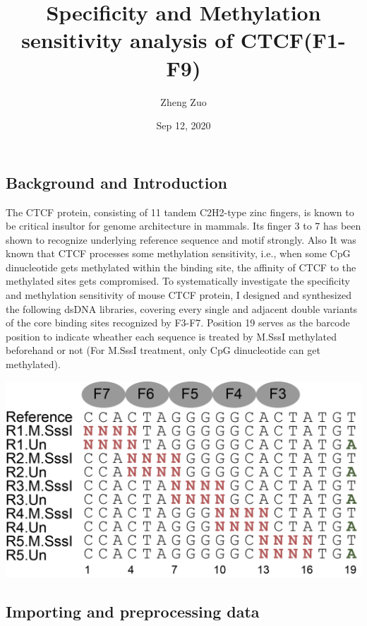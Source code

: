\documentclass[
]{article}
\title{Specificity and Methylation sensitivity analysis of CTCF(F1-F9)}
\author{Zheng Zuo}
\date{Sep 12, 2020}
\begin{document}
\maketitle

{
\setcounter{tocdepth}{2}
\tableofcontents
}
\hypertarget{background-and-introduction}{%
\subsection{Background and
Introduction}\label{background-and-introduction}}

The CTCF protein, consisting of 11 tandem C2H2-type zinc fingers, is
known to be critical insultor for genome architecture in mammals. Its
finger 3 to 7 has been shown to recognize underlying reference sequence
and motif strongly. Also It was known that CTCF processes some
methylation sensitivity, i.e., when some CpG dinucleotide gets
methylated within the binding site, the affinity of CTCF to the
methylated sites gets compromised. To systematically investigate the
specificity and methylation sensitivity of mouse CTCF protein, I
designed and synthesized the following dsDNA libraries, covering every
single and adjacent double variants of the core binding sites recognized
by F3-F7. Position 19 serves as the barcode position to indicate
wheather each sequence is treated by M.SssI methylated beforehand or not
(For M.SssI treatment, only CpG dinucleotide can get methylated).

\includegraphics{./CTCF libraries design.png}

\hypertarget{importing-and-preprocessing-data}{%
\subsection{Importing and preprocessing
data}\label{importing-and-preprocessing-data}}
\end{document}
